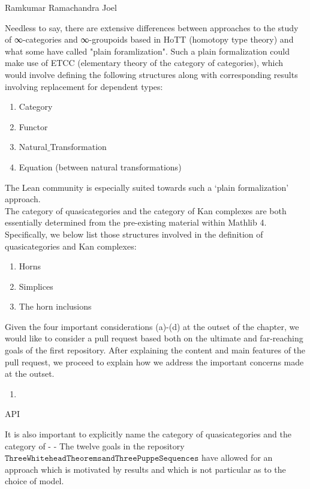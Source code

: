 \documentclass{book}
\begin{document}
Ramkumar Ramachandra
Joel

Needless to say, there are extensive differences between approaches to the study of ∞-categories and ∞-groupoids based in HoTT (homotopy type theory) and what some have called "plain foramlization". Such a plain formalization could make use of ETCC (elementary theory of the category of categories), which would involve defining the following structures along with corresponding results involving replacement for dependent types:

\begin{enumerate}
\item Category
\item Functor 
\item Natural$\_$Transformation
\item Equation (between natural transformations)
\end{enumerate}

The Lean community is especially suited towards such a `plain formalization' approach. \\

The category of quasicategories and the category of Kan complexes are both essentially determined from the pre-existing material within Mathlib 4. Specifically, we below list those structures involved in the definition of quasicategories and Kan complexes:

\begin{enumerate}
\item Horns
\item Simplices
\item The horn inclusions
\end{enumerate}

Given the four important considerations (a)-(d) at the outset of the chapter, we would like to consider a pull request based both on the ultimate and far-reaching goals of the first repository. After explaining the content and main features of the pull request, we proceed to explain how we address the important concerns made at the outset.

\begin{enumerate}
\item 
\end{enumerate}

API 

It is also important to explicitly name the category of quasicategories and the category of 
-
-
The twelve goals in the repository $\texttt{ThreeWhiteheadTheoremsandThreePuppeSequences}$ have allowed for an approach which is motivated by results and which is not particular as to the choice of model. \\
\end{document}
